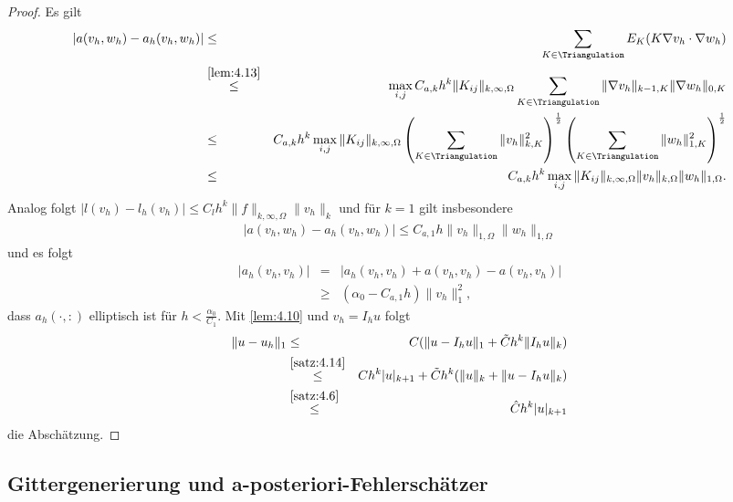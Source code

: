 \begin{proof}
    Es gilt
    \begin{eqnarray*}
              |a(v_h, w_h) - a_h(v_h, w_h)|
        &\le& \sum_{K\in\Triangulation} E_K(K \nabla v_h \cdot \nabla w_h) \\
        &\stackrel{\eqref{lem:4.13}}{\le}&
              \max_{i,j} C_{a,k} h^k \|K_{ij}\|_{k,\infty,\Omega}
              \sum_{K\in\Triangulation} \|\nabla v_h\|_{k-1,K}
              \|\nabla w_h\|_{0,K} \\
        &\le& C_{a,k} h^k \max_{i,j} \|K_{ij}\|_{k,\infty,\Omega}
              \left(\sum_{K\in\Triangulation} \|v_h\|_{k,K}^2
              \right)^\frac{1}{2}
              \left(\sum_{K\in\Triangulation} \|w_h\|_{1,K}^2\right)^\frac{1}{2}
              \\
        &\le& C_{a,k} h^k \max_{i,j} \|K_{ij}\|_{k,\infty,\Omega}
              \|v_h\|_{k,\Omega} \|w_h\|_{1,\Omega}.
    \end{eqnarray*}
    Analog folgt $|l(v_h) - l_h(v_h)| \le C_l h^k \|f\|_{k,\infty,\Omega} \|v_h\|_k$
    und für $k = 1$ gilt insbesondere
    \begin{eqnarray*}
            |a(v_h, w_h) - a_h(v_h, w_h)|
        \le C_{a,1} h \|v_h\|_{1,\Omega} \|w_h\|_{1,\Omega}
    \end{eqnarray*}
    und es folgt
    \begin{eqnarray*}
            |a_h(v_h, v_h)|
        &=& |a_h(v_h, v_h) + a(v_h, v_h) - a(v_h, v_h)| \\
        &\ge& (\alpha_0 - C_{a,1} h) \|v_h\|_1^2,
    \end{eqnarray*}
    dass $a_h(\cdot, :)$ elliptisch ist für $h < \frac{\alpha_0}{C_1}$.
    Mit \eqref{lem:4.10} und $v_h = I_h u$ folgt
    \begin{eqnarray*}
              \|u - u_h\|_1
        &\le& C (\|u - I_h u\|_1 + \tilde C h^k \|I_h u\|_k) \\
        &\stackrel{\eqref{satz:4.14}}{\le}&
              C h^k |u|_{k+1} + \tilde C h^k (\|u\|_k + \|u - I_h u\|_k) \\
        &\stackrel{\eqref{satz:4.6}}{\le}&
              \hat C h^k |u|_{k+1}
    \end{eqnarray*}
    die Abschätzung.
\end{proof}


\subsection{Gittergenerierung und a-posteriori-Fehlerschätzer}



